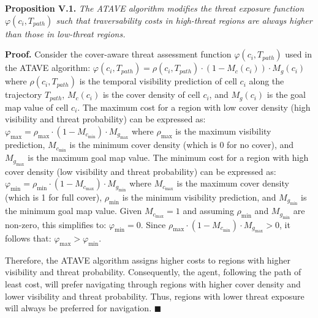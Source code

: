 

\textbf{Proposition V.1.} \textit{The ATAVE algorithm modifies the threat exposure function \(\varphi(c_i, T_{path})\) such that traversability costs in high-threat regions are always higher than those in low-threat regions.} 

\textbf{Proof.} Consider the cover-aware threat assessment function \(\varphi(c_i, T_{path})\) used in the ATAVE algorithm: \(\varphi(c_i, T_{path}) = \rho(c_i, T_{path}) \cdot (1 - M_c(c_i)) \cdot M_g(c_i)\) where \(\rho(c_i, T_{path})\) is the temporal visibility prediction of cell \(c_i\) along the trajectory \(T_{path}\), \(M_c(c_i)\) is the cover density of cell \(c_i\), and \(M_g(c_i)\) is the goal map value of cell \(c_i\). The maximum cost for a region with low cover density (high visibility and threat probability) can be expressed as: \(\varphi_{\max} = \rho_{\max} \cdot (1 - M_{c_{\min}}) \cdot M_{g_{\max}}\) where \(\rho_{\max}\) is the maximum visibility prediction, \(M_{c_{\min}}\) is the minimum cover density (which is 0 for no cover), and \(M_{g_{\max}}\) is the maximum goal map value. The minimum cost for a region with high cover density (low visibility and threat probability) can be expressed as: \(\varphi_{\min} = \rho_{\min} \cdot (1 - M_{c_{\max}}) \cdot M_{g_{\min}}\) where \(M_{c_{\max}}\) is the maximum cover density (which is 1 for full cover), \(\rho_{\min}\) is the minimum visibility prediction, and \(M_{g_{\min}}\) is the minimum goal map value. Given \(M_{c_{\max}} = 1\) and assuming \(\rho_{\min}\) and \(M_{g_{\min}}\) are non-zero, this simplifies to: \(\varphi_{\min} = 0\). Since \(\rho_{\max} \cdot (1 - M_{c_{\min}}) \cdot M_{g_{\max}} > 0\), it follows that: \(\varphi_{\max} > \varphi_{\min}\). 

Therefore, the ATAVE algorithm assigns higher costs to regions with higher visibility and threat probability. Consequently, the agent, following the path of least cost, will prefer navigating through regions with higher cover density and lower visibility and threat probability. Thus, regions with lower threat exposure will always be preferred for navigation. \(\blacksquare\)


